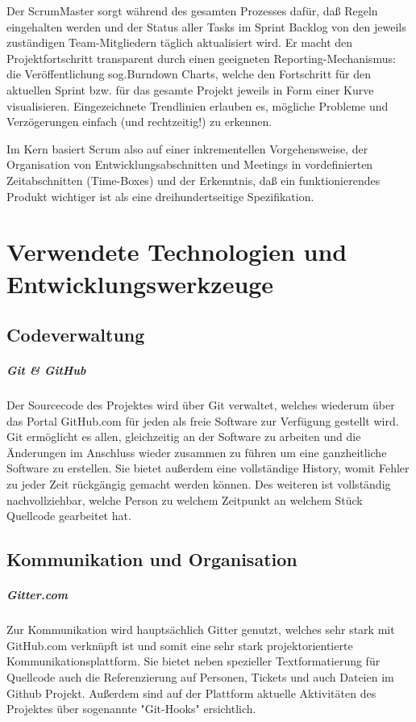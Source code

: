 \documentclass[11pt]{scrreprt}
\begin{document}
Der ScrumMaster sorgt während des gesamten Prozesses dafür, daß Regeln eingehalten werden und der Status aller Tasks im Sprint Backlog von den jeweils zuständigen Team-Mitgliedern täglich aktualisiert wird. Er macht den Projektfortschritt transparent durch einen geeigneten Reporting-Mechanismus: die Veröffentlichung sog.Burndown Charts, welche den Fortschritt für den aktuellen Sprint bzw. für das gesamte Projekt jeweils in Form einer Kurve visualisieren. Eingezeichnete Trendlinien erlauben es, mögliche Probleme und Verzögerungen einfach (und rechtzeitig!) zu erkennen.

Im Kern basiert Scrum also auf einer inkrementellen Vorgehensweise, der Organisation von Entwicklungsabschnitten und Meetings in vordefinierten Zeitabschnitten (Time-Boxes) und der Erkenntnis, daß ein funktionierendes Produkt wichtiger ist als eine dreihundertseitige Spezifikation.

\chapter{Verwendete Technologien und Entwicklungswerkzeuge}
\section{Codeverwaltung}
\paragraph{Git \& GitHub}
Der Sourcecode des Projektes wird über Git verwaltet, welches wiederum über das Portal GitHub.com für jeden als freie Software zur Verf\"ugung gestellt wird.
Git ermöglicht es allen, gleichzeitig an der Software zu arbeiten und die \"Anderungen im Anschluss wieder zusammen zu f\"uhren um eine ganzheitliche Software zu erstellen. Sie bietet außerdem eine vollst\"andige History, womit Fehler zu jeder Zeit r\"uckg\"angig gemacht werden k\"onnen.
Des weiteren ist vollst\"andig nachvollziehbar, welche Person zu welchem Zeitpunkt an welchem St\"uck Quellcode gearbeitet hat.

\section{Kommunikation und Organisation}
\paragraph{Gitter.com}
Zur Kommunikation wird haupts\"achlich Gitter genutzt, welches sehr stark mit GitHub.com verkn\"upft ist und somit eine sehr stark projektorientierte Kommunikationsplattform. Sie bietet neben spezieller Textformatierung f\"ur Quellcode auch die Referenzierung auf Personen, Tickets und auch Dateien im Github Projekt. Außerdem sind auf der Plattform aktuelle Aktivit\"aten des Projektes \"uber sogenannte "Git-Hooks" ersichtlich.
\end{document}
